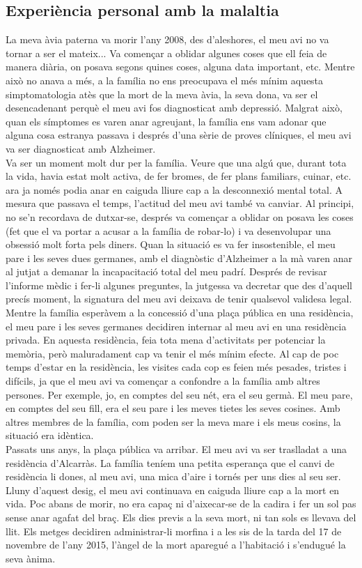 \documentclass[a4paper,12pt]{article}
\begin{document}
\subsection*{Experiència personal amb la malaltia}
La meva àvia paterna va morir l'any 2008, des d'aleshores, el meu avi no va tornar a ser el mateix... Va començar a oblidar algunes coses que ell feia de manera diària, on posava segons quines coses, alguna data important, etc. Mentre això no anava a més, a la família no ens preocupava el més mínim aquesta simptomatologia atès que la mort de la meva àvia, la seva dona, va ser el desencadenant perquè el meu avi fos diagnosticat amb depressió. Malgrat això, quan els símptomes es varen anar agreujant, la família ens vam adonar que alguna cosa estranya passava i després d'una sèrie de proves clíniques, el meu avi va ser diagnosticat amb Alzheimer.\\
Va ser un moment molt dur per la família. Veure que una algú que, durant tota la vida, havia estat molt activa, de fer bromes, de fer plans familiars, cuinar, etc. ara ja només podia anar en caiguda lliure cap a la desconnexió mental total. A mesura que passava el temps, l'actitud del meu avi també va canviar. Al principi, no se'n recordava de dutxar-se, després va començar a oblidar on posava les coses (fet que el va portar a acusar a la família de robar-lo) i va desenvolupar una obsessió molt forta pels diners. Quan la situació es va fer insostenible, el meu pare i les seves dues germanes, amb el diagnòstic d'Alzheimer a la mà varen anar al jutjat a demanar la incapacitació total del meu padrí. Després de revisar l'informe mèdic i fer-li algunes preguntes, la jutgessa va decretar que des d'aquell precís moment, la signatura del meu avi deixava de tenir qualsevol validesa legal.\\
Mentre la família esperàvem a la concessió d'una plaça pública en una residència, el meu pare i les seves germanes decidiren internar al meu avi en una residència privada. En aquesta residència, feia tota mena d'activitats per potenciar la memòria, però maluradament cap va tenir el més mínim efecte. Al cap de poc temps d'estar en la residència, les visites cada cop es feien més pesades, tristes i difícils, ja que el meu avi va començar a confondre a la família amb altres persones. Per exemple, jo, en comptes del seu nét, era el seu germà. El meu pare, en comptes del seu fill, era el seu pare i les meves tietes les seves cosines. Amb altres membres de la família, com poden ser la meva mare i els meus cosins, la situació era idèntica.\\
Passats uns anys, la plaça pública va arribar. El meu avi va ser traslladat a una residència d'Alcarràs. La família teníem una petita esperança que el canvi de residència li dones, al meu avi, una mica d'aire i tornés per uns dies al seu ser. Lluny d'aquest desig, el meu avi continuava en caiguda lliure cap a la mort en vida. Poc abans de morir, no era capaç ni d'aixecar-se de la cadira i fer un sol pas sense anar agafat del braç. Els dies previs a la seva mort, ni tan sols es llevava del llit. Els metges decidiren administrar-li morfina i a les sis de la tarda del 17 de novembre de l'any 2015, l'àngel de la mort aparegué a l'habitació i s'endugué la seva ànima.
\end{document}
